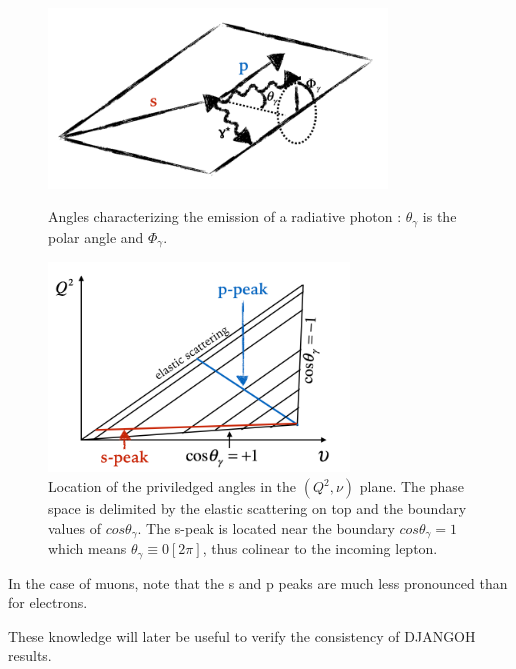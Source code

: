 \begin{figure}[hbt]
\parbox{8cm}{
\includegraphics[width=9cm]{gfx/plan_angle.png}
\caption{Angles characterizing the emission of a radiative photon : $\theta_\gamma$ is the polar angle and $\Phi_\gamma$.}
\label{fig:plan}}
\qquad
\begin{minipage}{8cm}
\includegraphics[width=8cm]{gfx/peaks.png}
\caption{Location of the priviledged angles in the $(Q^2,\nu)$ plane. The phase space is delimited by the elastic scattering
on top and the boundary values of $cos\theta_\gamma$. The s-peak is located near the boundary $cos\theta_\gamma=1$ which means
$\theta_\gamma \equiv 0[2\pi]$, thus colinear to the incoming lepton.}
\label{fig:peaks}
\end{minipage}
\end{figure}

In the case of muons, note that the s and p peaks are much less pronounced than for electrons.

These knowledge will later be useful to verify the consistency of DJANGOH results.
